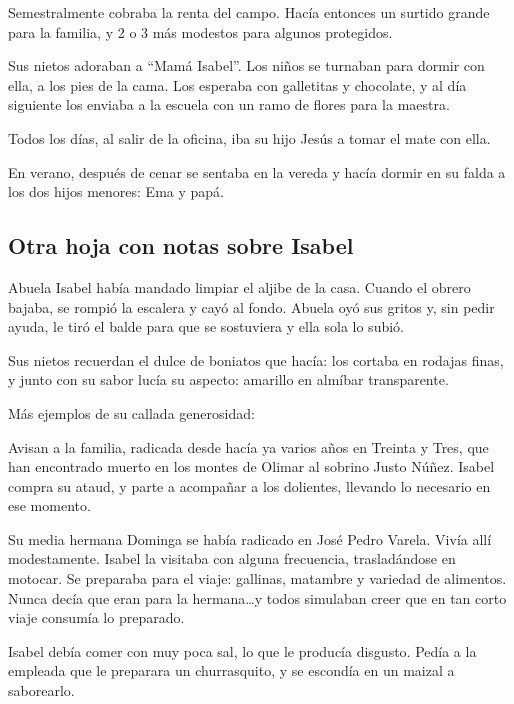\documentclass{article}
\begin{document}
Semestralmente cobraba la renta del campo. Hacía entonces un surtido grande para la familia, y 2 o 3 más modestos para algunos protegidos.

Sus nietos adoraban a ``Mamá Isabel''. Los niños se turnaban para dormir con ella, a los pies de la cama. Los esperaba con galletitas y chocolate, y al día siguiente los enviaba a la escuela con un ramo de flores para la maestra.

Todos los días, al salir de la oficina, iba su hijo Jesús a tomar el mate con ella.

En verano, después de cenar se sentaba en la vereda y hacía dormir en su falda a los dos hijos menores: Ema y papá.

\subsection{Otra hoja con notas sobre Isabel}

Abuela Isabel había mandado limpiar el aljibe de la casa. Cuando el obrero bajaba, se rompió la escalera y cayó al fondo. Abuela oyó sus gritos y, sin pedir ayuda, le tiró el balde para que se sostuviera y ella sola lo subió.

\bigbreak{}

Sus nietos recuerdan el dulce de boniatos que hacía: los cortaba en rodajas finas, y junto con su sabor lucía su aspecto: amarillo en almíbar transparente.

\bigbreak{}

Más ejemplos de su callada generosidad:

Avisan a la familia, radicada desde hacía ya varios años en Treinta y Tres, que han encontrado muerto en los montes de Olimar al sobrino Justo Núñez. Isabel compra su ataud, y parte a acompañar a los dolientes, llevando lo necesario en ese momento.

\bigbreak{}

Su media hermana Dominga se había radicado en José Pedro Varela. Vivía allí modestamente. Isabel la visitaba con alguna frecuencia, trasladándose en motocar. Se preparaba para el viaje: gallinas, matambre y variedad de alimentos. Nunca decía que eran para la hermana\ldots y todos simulaban creer que en tan corto viaje consumía lo preparado.

\bigbreak{}

Isabel debía comer con muy poca sal, lo que le producía disgusto. Pedía a la empleada que le preparara un churrasquito, y se escondía en un maizal a saborearlo.
\end{document}
